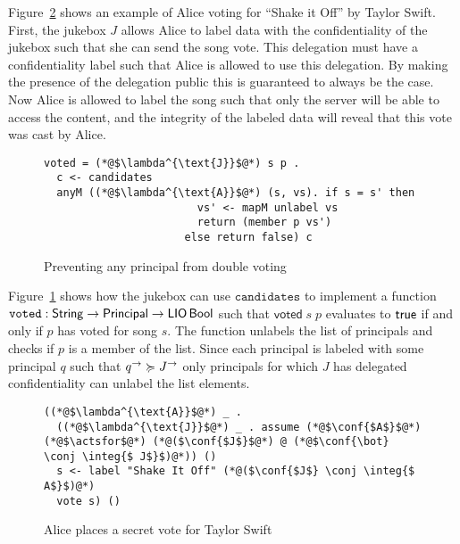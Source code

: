 Figure~\ref{fig:jukebox-alice-votes-for-taylor-swift} shows an example of Alice voting for ``Shake it Off'' by Taylor Swift. First, the jukebox $J$ allows Alice to label data with the confidentiality of the jukebox such that she can send the song vote. This delegation must have a confidentiality label such that Alice is allowed to use this delegation. By making the presence of the delegation public this is guaranteed to always be the case. Now Alice is allowed to label the song such that only the server will be able to access the content, and the integrity of the labeled data will reveal that this vote was cast by Alice.

\begin{figure}
\centering
\begin{lstlisting}
voted = (*@$\lambda^{\text{J}}$@*) s p .
  c <- candidates
  anyM ((*@$\lambda^{\text{A}}$@*) (s, vs). if s = s' then
                        vs' <- mapM unlabel vs
                        return (member p vs')
                      else return false) c
\end{lstlisting}
\caption{Preventing any principal from double voting}
\label{fig:prevent-double-voting}
\end{figure}

Figure~\ref{fig:prevent-double-voting} shows how the jukebox can use $\mathtt{candidates}$ to implement a function $\mathtt{voted}: \mathsf{String} \to \mathsf{Principal} \to \mathsf{LIO}\,\mathsf{Bool}$ such that $\mathsf{voted}\; s\; p$ evaluates to $\mathsf{true}$ if and only if $p$ has voted for song $s$. The function unlabels the list of principals and checks if $p$ is a member of the list. Since each principal is labeled with some principal $q$ such that $q^{\rightarrow} \succcurlyeq J^{\rightarrow}$ only principals for which $J$ has delegated confidentiality can unlabel the list elements.

\begin{figure}
\centering
\begin{lstlisting}
((*@$\lambda^{\text{A}}$@*) _ .
  ((*@$\lambda^{\text{J}}$@*) _ . assume (*@$\conf{$A$}$@*) (*@$\actsfor$@*) (*@($\conf{$J$}$@*) @ (*@$\conf{\bot} \conj \integ{$ J$}$)@*)) ()
  s <- label "Shake It Off" (*@($\conf{$J$} \conj \integ{$ A$}$)@*)
  vote s) ()
\end{lstlisting}
\caption{Alice places a secret vote for Taylor Swift}
\label{fig:jukebox-alice-votes-for-taylor-swift}
\end{figure}


